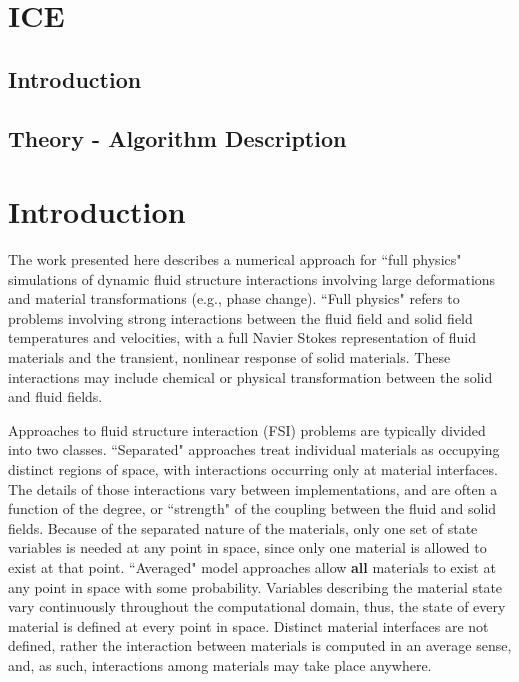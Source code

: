 \newcommand{\SUM}{\raise1.5pt\hbox{$\scriptstyle\sum_{s=1}^N$}}

\section{ICE} \label{Sec:ICE}


\subsection{Introduction}

\subsection{Theory - Algorithm Description}

\section{Introduction}

The work presented here describes a numerical approach for ``full
physics" simulations of dynamic fluid structure interactions involving
large deformations and material transformations (e.g., phase change).
``Full physics" refers to problems involving strong interactions between
the fluid field and solid field temperatures and velocities, with a full
Navier Stokes representation of fluid materials and the transient, nonlinear
response of solid materials.  These interactions may include chemical or
physical transformation between the solid and fluid fields.

Approaches to fluid structure interaction (FSI) problems are typically
divided into two classes.  ``Separated" approaches treat individual materials
as occupying distinct regions of space, with interactions occurring only
at material interfaces.  The details of those interactions vary between
implementations, and are often a function of the degree, or ``strength" of
the coupling between the fluid and solid fields.  Because of the separated
nature of the materials, only one set of state variables is needed at any
point in space, since only one material is allowed to exist at that point.
``Averaged" model approaches allow {\bf all} materials to exist at any point in
space with some probability.    Variables describing the material state vary
continuously throughout the computational domain, thus, the state of every
material is defined at every point in space.  Distinct material interfaces are
not defined, rather the interaction between materials is computed in an average
sense, and, as such, interactions among materials may take place anywhere.

